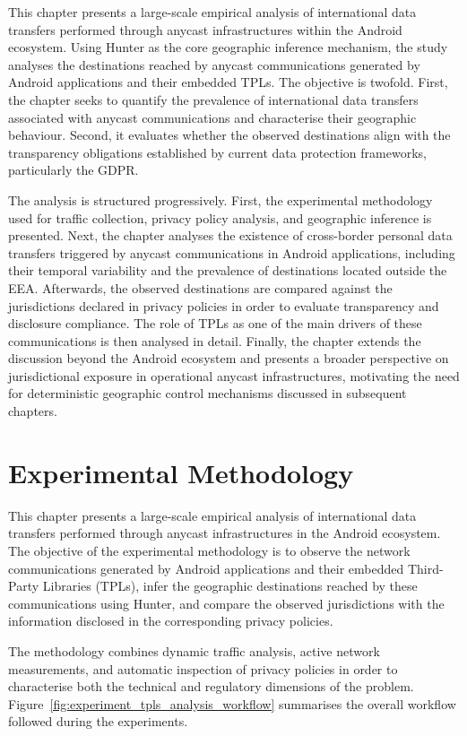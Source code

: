 This chapter presents a large-scale empirical analysis of international data transfers performed through anycast infrastructures within the Android ecosystem. Using Hunter as the core geographic inference mechanism, the study analyses the destinations reached by anycast communications generated by Android applications and their embedded TPLs. The objective is twofold. First, the chapter seeks to quantify the prevalence of international data transfers associated with anycast communications and characterise their geographic behaviour. Second, it evaluates whether the observed destinations align with the transparency obligations established by current data protection frameworks, particularly the GDPR.

The analysis is structured progressively. First, the experimental methodology used for traffic collection, privacy policy analysis, and geographic inference is presented. Next, the chapter analyses the existence of cross-border personal data transfers triggered by anycast communications in Android applications, including their temporal variability and the prevalence of destinations located outside the EEA. Afterwards, the observed destinations are compared against the jurisdictions declared in privacy policies in order to evaluate transparency and disclosure compliance. The role of TPLs as one of the main drivers of these communications is then analysed in detail. Finally, the chapter extends the discussion beyond the Android ecosystem and presents a broader perspective on jurisdictional exposure in operational anycast infrastructures, motivating the need for deterministic geographic control mechanisms discussed in subsequent chapters.

\section{Experimental Methodology}
\label{sc:anycast_experiments_methodology}

This chapter presents a large-scale empirical analysis of international data transfers performed through anycast infrastructures in the Android ecosystem. The objective of the experimental methodology is to observe the network communications generated by Android applications and their embedded Third-Party Libraries (TPLs), infer the geographic destinations reached by these communications using Hunter, and compare the observed jurisdictions with the information disclosed in the corresponding privacy policies.

The methodology combines dynamic traffic analysis, active network measurements, and automatic inspection of privacy policies in order to characterise both the technical and regulatory dimensions of the problem. Figure~\ref{fig:experiment_tpls_analysis_workflow} summarises the overall workflow followed during the experiments.


